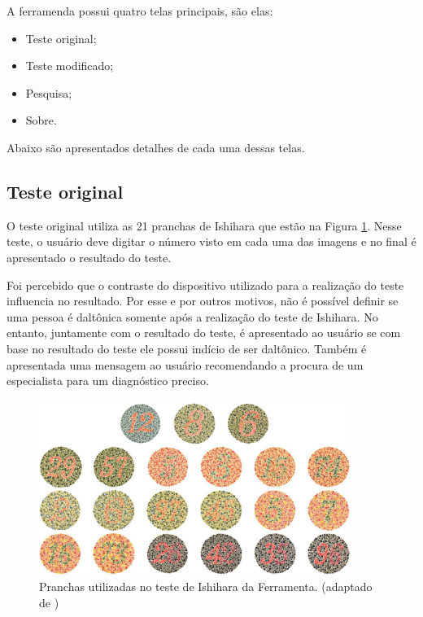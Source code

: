 \documentclass[	12pt, Times, openright, twoside, a4paper, english, brazil]{abntex2}
\begin{document}
A ferramenda possui quatro telas principais, são elas:

\begin{itemize}
\item Teste original;
\item Teste modificado;
\item Pesquisa;
\item Sobre.
\end{itemize}

Abaixo são apresentados detalhes de cada uma dessas telas.

\subsection{Teste original}
O teste original utiliza as 21 pranchas de Ishihara que estão na Figura \ref{fig:figuraTesteOriginalFerramenta}. Nesse teste, o usuário deve digitar o número visto em cada uma das imagens e no final é apresentado o resultado do teste. 

Foi percebido que o contraste do dispositivo utilizado para a realização do teste influencia no resultado. Por esse e por outros motivos, não é possível definir se uma pessoa é daltônica somente após a realização do teste de Ishihara. No entanto, juntamente com o resultado do teste, é apresentado ao usuário se com base no resultado do teste ele possui indício de ser daltônico. Também é apresentada uma mensagem ao usuário recomendando a procura de um especialista para um diagnóstico preciso.

\begin{figure}[!htb]
\centering \includegraphics[width=0.9\textwidth]{pranchas.JPG}
\caption{Pranchas utilizadas no teste de Ishihara da Ferramenta. (adaptado de )} \label{fig:figuraTesteOriginalFerramenta}
\end{figure}
\end{document}
